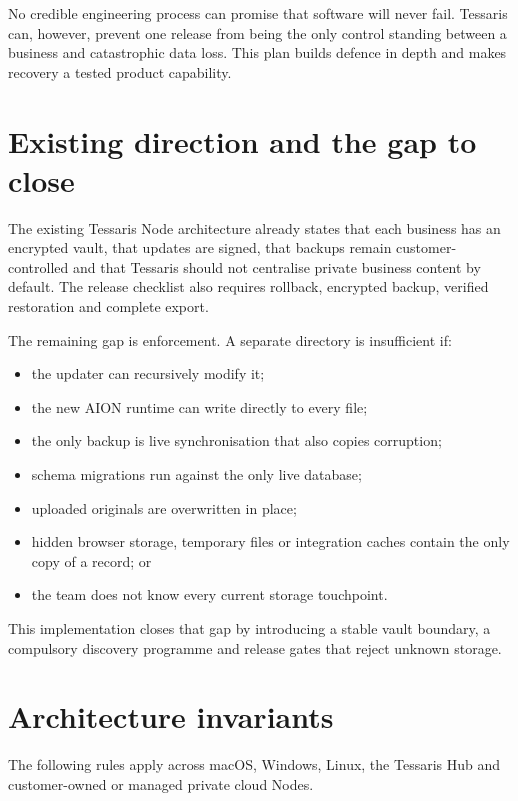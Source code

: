 \documentclass[11pt]{article}
\begin{document}
No credible engineering process can promise that software will never fail. Tessaris can, however, prevent one release from being the only control standing between a business and catastrophic data loss. This plan builds defence in depth and makes recovery a tested product capability.

\section{Existing direction and the gap to close}

The existing Tessaris Node architecture already states that each business has an encrypted vault, that updates are signed, that backups remain customer-controlled and that Tessaris should not centralise private business content by default. The release checklist also requires rollback, encrypted backup, verified restoration and complete export.

The remaining gap is enforcement. A separate directory is insufficient if:

\begin{itemize}
  \item the updater can recursively modify it;
  \item the new AION runtime can write directly to every file;
  \item the only backup is live synchronisation that also copies corruption;
  \item schema migrations run against the only live database;
  \item uploaded originals are overwritten in place;
  \item hidden browser storage, temporary files or integration caches contain the only copy of a record; or
  \item the team does not know every current storage touchpoint.
\end{itemize}

This implementation closes that gap by introducing a stable vault boundary, a compulsory discovery programme and release gates that reject unknown storage.

\section{Architecture invariants}

The following rules apply across macOS, Windows, Linux, the Tessaris Hub and customer-owned or managed private cloud Nodes.
\end{document}
